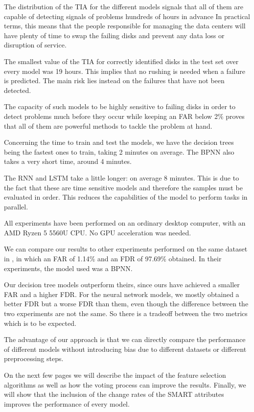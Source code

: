The distribution of the TIA for the different models signals that all of them are capable of detecting signals of problems hundreds of hours in advance
In practical terms, this means that the people responsible for managing the data centers will have plenty of time to swap the failing disks and prevent any data loss or disruption of service.

The smallest value of the TIA for correctly identified disks in the test set over every model was 19 hours.
This implies that no rushing is needed when a failure is predicted.
The main risk lies instead on the failures that have not been detected.

The capacity of such models to be highly sensitive to failing disks in order to detect problems much before they occur while keeping an FAR below 2\% proves that all of them are powerful methods to tackle the problem at hand.

Concerning the time to train and test the models, we have the decision trees being the fastest ones to train, taking 2 minutes on average.
The BPNN also takes a very short time, around 4 minutes.

The RNN and LSTM take a little longer: on average 8 minutes.
This is due to the fact that these are time sensitive models and therefore the samples must be evaluated in order.
This reduces the capabilities of the model to perform tasks in parallel.

All experiments have been performed on an ordinary desktop computer, with an AMD Ryzen 5 5560U CPU.
No GPU acceleration was needed.

We can compare our results to other experiments performed on the same dataset in \cite{Zhu13}, in which an FAR of 1.14\% and an FDR of 97.69\% obtained.
In their experiments, the model used was a BPNN.

Our decision tree models outperform theirs, since ours have achieved a smaller FAR and a higher FDR.
For the neural network models, we mostly obtained a better FDR but a worse FDR than them, even though the difference between the two experiments are not the same.
So there is a tradeoff between the two metrics which is to be expected.

The advantage of our approach is that we can directly compare the performance of different models without introducing bias due to different datasets or different preprocessing steps.

On the next few pages we will describe the impact of the feature selection algorithms as well as how the voting process can improve the results.
Finally, we will show that the inclusion of the change rates of the SMART attributes improves the performance of every model.

